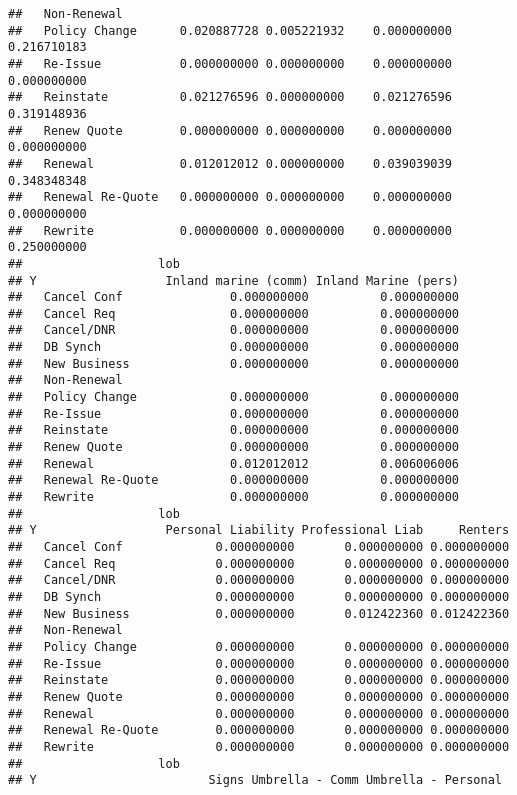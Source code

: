 \documentclass[]{article}
\begin{document}
\begin{verbatim}
##   Non-Renewal                                                          
##   Policy Change      0.020887728 0.005221932    0.000000000 0.216710183
##   Re-Issue           0.000000000 0.000000000    0.000000000 0.000000000
##   Reinstate          0.021276596 0.000000000    0.021276596 0.319148936
##   Renew Quote        0.000000000 0.000000000    0.000000000 0.000000000
##   Renewal            0.012012012 0.000000000    0.039039039 0.348348348
##   Renewal Re-Quote   0.000000000 0.000000000    0.000000000 0.000000000
##   Rewrite            0.000000000 0.000000000    0.000000000 0.250000000
##                   lob
## Y                  Inland marine (comm) Inland Marine (pers)
##   Cancel Conf               0.000000000          0.000000000
##   Cancel Req                0.000000000          0.000000000
##   Cancel/DNR                0.000000000          0.000000000
##   DB Synch                  0.000000000          0.000000000
##   New Business              0.000000000          0.000000000
##   Non-Renewal                                               
##   Policy Change             0.000000000          0.000000000
##   Re-Issue                  0.000000000          0.000000000
##   Reinstate                 0.000000000          0.000000000
##   Renew Quote               0.000000000          0.000000000
##   Renewal                   0.012012012          0.006006006
##   Renewal Re-Quote          0.000000000          0.000000000
##   Rewrite                   0.000000000          0.000000000
##                   lob
## Y                  Personal Liability Professional Liab     Renters
##   Cancel Conf             0.000000000       0.000000000 0.000000000
##   Cancel Req              0.000000000       0.000000000 0.000000000
##   Cancel/DNR              0.000000000       0.000000000 0.000000000
##   DB Synch                0.000000000       0.000000000 0.000000000
##   New Business            0.000000000       0.012422360 0.012422360
##   Non-Renewal                                                      
##   Policy Change           0.000000000       0.000000000 0.000000000
##   Re-Issue                0.000000000       0.000000000 0.000000000
##   Reinstate               0.000000000       0.000000000 0.000000000
##   Renew Quote             0.000000000       0.000000000 0.000000000
##   Renewal                 0.000000000       0.000000000 0.000000000
##   Renewal Re-Quote        0.000000000       0.000000000 0.000000000
##   Rewrite                 0.000000000       0.000000000 0.000000000
##                   lob
## Y                        Signs Umbrella - Comm Umbrella - Personal

\end{verbatim}
\end{document}
